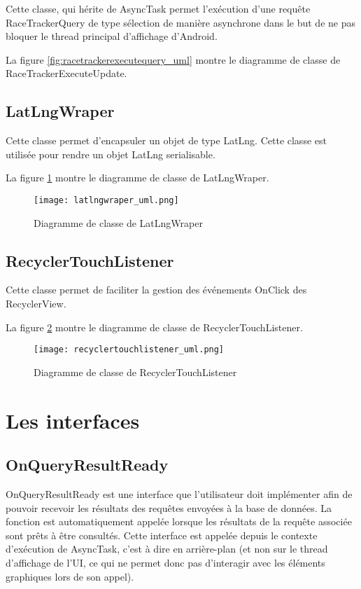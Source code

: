 Cette classe, qui hérite de AsyncTask permet l'exécution d'une requête RaceTrackerQuery de type sélection de manière asynchrone dans le but de ne pas bloquer le thread principal d'affichage d'Android.

La figure \ref{fig:racetrackerexecutequery_uml} montre le diagramme de classe de RaceTrackerExecuteUpdate.

\subsection{LatLngWraper}

Cette classe permet d'encapsuler un objet de type LatLng. Cette classe est utilisée pour rendre un objet LatLng serialisable.

La figure \ref{fig:latlngwraper_uml} montre le diagramme de classe de LatLngWraper.

\begin{figure}[htb]
\centering 
\texttt{[image: latlngwraper\_uml.png]} 
\caption{Diagramme de classe de LatLngWraper}
\label{fig:latlngwraper_uml}
 \end{figure}

\subsection{RecyclerTouchListener}

Cette classe permet de faciliter la gestion des événements OnClick des RecyclerView.

La figure \ref{fig:recyclertouchlistener_uml} montre le diagramme de classe de RecyclerTouchListener.

\begin{figure}[htb]
\centering 
\texttt{[image: recyclertouchlistener\_uml.png]} 
\caption{Diagramme de classe de RecyclerTouchListener}
\label{fig:recyclertouchlistener_uml}
 \end{figure}

\section{Les interfaces}

\subsection{OnQueryResultReady}

OnQueryResultReady est une interface que l'utilisateur doit implémenter afin de pouvoir recevoir les résultats des requêtes envoyées à la base de données. La fonction est automatiquement appelée lorsque les résultats de la requête associée sont prêts à être consultés. Cette interface est appelée depuis le contexte d'exécution de AsyncTask, c'est à dire en arrière-plan (et non sur le thread d'affichage de l'UI, ce qui ne permet donc pas d'interagir avec les éléments graphiques lors de son appel).

